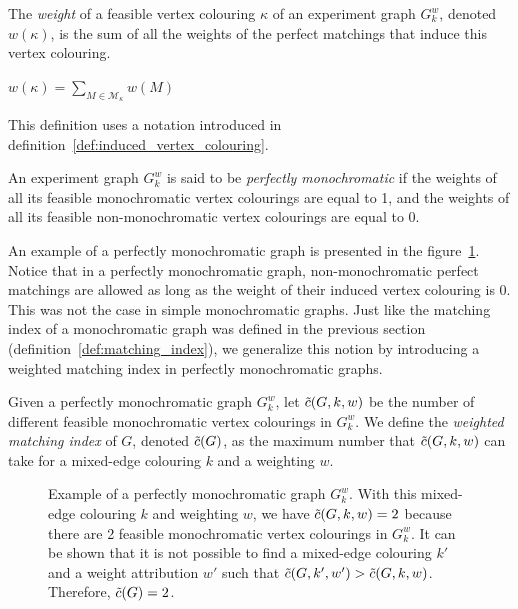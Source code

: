 \begin{definition}
    \label{def:vertex_colouring_weight}
    The \textit{weight} of a feasible vertex colouring $\kappa$ of an experiment graph $G_k^w$, denoted $w(\kappa)$, is the sum of all the weights of the perfect matchings that induce this vertex colouring.
    
    \begin{center}
        $w(\kappa) = \sum\limits_{M \in \mathcal{M}_{\kappa}} w(M)$
    \end{center}

    This definition uses a notation introduced in definition~\ref{def:induced_vertex_colouring}.
\end{definition}

\begin{definition}
    \label{def:perfectly_monochromatic_graph}
    An experiment graph $G_k^w$ is said to be \textit{perfectly monochromatic} if the weights of all its feasible monochromatic vertex colourings are equal to 1, and the weights of all its feasible non-monochromatic vertex colourings are equal to 0.
\end{definition}

An example of a perfectly monochromatic graph is presented in the figure~\ref{fig:perfectly_mono}.
Notice that in a perfectly monochromatic graph, non-monochromatic perfect matchings are allowed as long as the weight of their induced vertex colouring is 0.
This was not the case in simple monochromatic graphs.
Just like the matching index of a monochromatic graph was defined in the previous section (definition~\ref{def:matching_index}), we generalize this notion by introducing a weighted matching index in perfectly monochromatic graphs.

\begin{definition}
    \label{def:weighted_matching_index}
    Given a perfectly monochromatic graph $G_k^w$, let $\Tilde{c}(G, k, w)$ be the number of different feasible monochromatic vertex colourings in $G_k^w$.
    We define the \textit{weighted matching index} of $G$, denoted $\Tilde{c}(G)$, as the maximum number that $\Tilde{c}(G, k, w)$ can take for a mixed-edge colouring $k$ and a weighting $w$.
\end{definition}

\begin{figure}[H]
    \caption{Example of a perfectly monochromatic graph $G_k^w$.
        With this mixed-edge colouring $k$ and weighting $w$, we have $\Tilde{c}(G, k, w) = 2$ because there are 2 feasible monochromatic vertex colourings in $G_k^w$.
        It can be shown that it is not possible to find a mixed-edge colouring $k'$ and a weight attribution $w'$ such that $\Tilde{c}(G, k', w') > \Tilde{c}(G, k, w)$.
        Therefore, $\Tilde{c}(G) = 2$.}
    \label{fig:perfectly_mono}
\end{figure}

